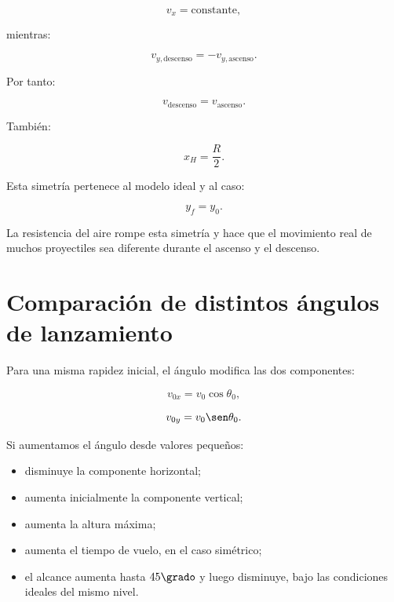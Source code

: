 \[
v_x=\text{constante},
\]

mientras:

\[
v_{y,\mathrm{descenso}}
=
-v_{y,\mathrm{ascenso}}.
\]

Por tanto:

\[
v_{\mathrm{descenso}}
=
v_{\mathrm{ascenso}}.
\]

También:

\[
x_H=\frac{R}{2}.
\]

\begin{advertencia}
Esta simetría pertenece al modelo ideal y al caso:

\[
y_f=y_0.
\]

La resistencia del aire rompe esta simetría y hace que el movimiento real de
muchos proyectiles sea diferente durante el ascenso y el descenso.
\end{advertencia}


\section{Comparación de distintos ángulos de lanzamiento}

Para una misma rapidez inicial, el ángulo modifica las dos componentes:

\[
v_{0x}=v_0\cos\theta_0,
\]

\[
v_{0y}=v_0\sen\theta_0.
\]

Si aumentamos el ángulo desde valores pequeños:

\begin{itemize}
    \item disminuye la componente horizontal;
    \item aumenta inicialmente la componente vertical;
    \item aumenta la altura máxima;
    \item aumenta el tiempo de vuelo, en el caso simétrico;
    \item el alcance aumenta hasta \(45\grado\) y luego disminuye, bajo las
    condiciones ideales del mismo nivel.
\end{itemize}

